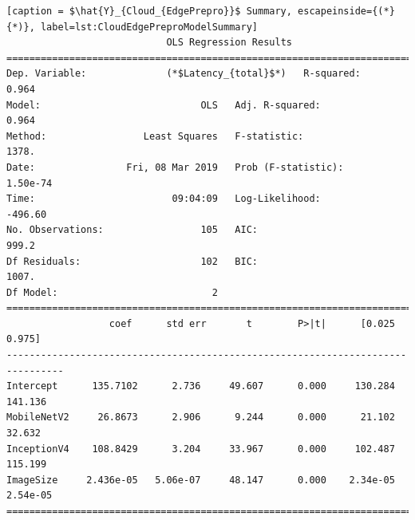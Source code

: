 \begin{minipage}{\linewidth}
\begin{lstlisting}[caption = $\hat{Y}_{Cloud_{EdgePrepro}}$ Summary, escapeinside={(*}{*)}, label=lst:CloudEdgePreproModelSummary]
                            OLS Regression Results                            
==============================================================================
Dep. Variable:              (*$Latency_{total}$*)   R-squared:                       0.964
Model:                            OLS   Adj. R-squared:                  0.964
Method:                 Least Squares   F-statistic:                     1378.
Date:                Fri, 08 Mar 2019   Prob (F-statistic):           1.50e-74
Time:                        09:04:09   Log-Likelihood:                -496.60
No. Observations:                 105   AIC:                             999.2
Df Residuals:                     102   BIC:                             1007.
Df Model:                           2                                         
================================================================================
                  coef      std err       t        P>|t|      [0.025      0.975]
--------------------------------------------------------------------------------
Intercept      135.7102      2.736     49.607      0.000     130.284     141.136
MobileNetV2     26.8673      2.906      9.244      0.000      21.102      32.632
InceptionV4    108.8429      3.204     33.967      0.000     102.487     115.199
ImageSize     2.436e-05   5.06e-07     48.147      0.000    2.34e-05    2.54e-05
================================================================================
\end{lstlisting}
\end{minipage}

